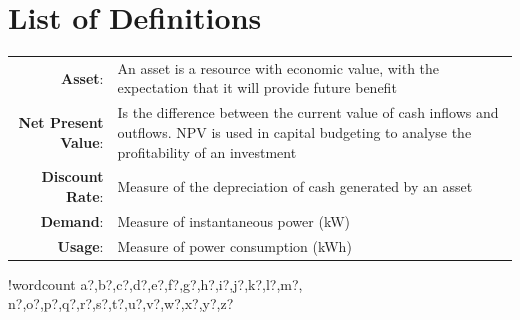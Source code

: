 \documentclass[fontsize=9.5pt]{extarticle}
\numberwithin{figure}{section} %
\newcounter{words}
\newenvironment{counted}{%
  \setcounter{words}{0}
  \SearchList!{wordcount}{\stepcounter{words}}
    {a?,b?,c?,d?,e?,f?,g?,h?,i?,j?,k?,l?,m?,
    n?,o?,p?,q?,r?,s?,t?,u?,v?,w?,x?,y?,z?}
  \UndoBoundary{'}
  \SearchOrder{p;}}{%
  \StopSearching}
\begin{document}
\section*{List of Definitions}\label{defs}
\begin{tabular}{r p{12cm}}
\textbf{Asset}:& An asset is a resource with economic value, with the expectation that it will provide future benefit \\
\textbf{Net Present Value}:& Is the difference between the current value of cash inflows and outflows. NPV is used in capital budgeting to analyse the profitability of an investment \\
\textbf{Discount Rate}:& Measure of the depreciation of cash generated by an asset \\
\textbf{Demand}:& Measure of instantaneous power (kW)\\
\textbf{Usage}:& Measure of power consumption (kWh)\\
\end{tabular}

\newpage

\clearpage
\cfoot{\thepage}
\begin{counted} %
\end{document}
